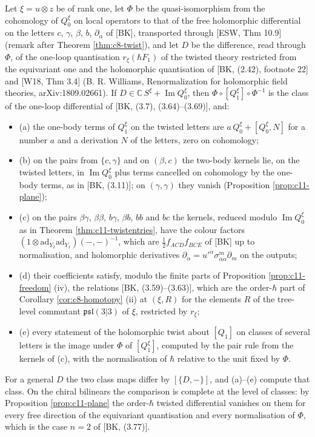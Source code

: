 \begin{theorem}
\label{thm:c11-twistcheck}
Let $\xi=u\otimes z$ be of rank one, let $\Phi$ be the quasi-isomorphism from the cohomology of $Q^\xi_0$ on local operators to that of the free holomorphic differential on the letters $c$, $\gamma$, $\beta$, $b$, $\partial_{\dot\alpha}$ of [BK], transported through [ESW, Thm 10.9] (remark after Theorem \ref{thm:c8-twist}), and let $D$ be the difference, read through $\Phi$, of the one-loop quantisation $r_\xi(\hbar F_1)$ of the twisted theory restricted from the equivariant one and the holomorphic quantisation of [BK, (2.42), footnote 22] and [W18, Thm 3.4] (B. R. Williams, Renormalization for holomorphic field theories, arXiv:1809.02661). If $D\in\mathbb C\,S^\xi+\operatorname{Im}Q^\xi_0$, then $\Phi\circ[Q^\xi_1]\circ\Phi^{-1}$ is the class of the one-loop differential of [BK, (3.7), (3.64)--(3.69)], and:
\begin{itemize}
\item (a) the one-body terms of $Q^\xi_1$ on the twisted letters are $a\,Q^\xi_0+[Q^\xi_0,N]$ for a number $a$ and a derivation $N$ of the letters, zero on cohomology;
\item (b) on the pairs from $\{c,\gamma\}$ and on $(\beta,c)$ the two-body kernels lie, on the twisted letters, in $\operatorname{Im}Q^\xi_0$ plus terms cancelled on cohomology by the one-body terms, as in [BK, (3.11)]; on $(\gamma,\gamma)$ they vanish (Proposition \ref{prop:c11-plane});
\item (c) on the pairs $\beta\gamma$, $\beta\beta$, $b\gamma$, $\beta b$, $bb$ and $bc$ the kernels, reduced modulo $\operatorname{Im}Q^\xi_0$ as in Theorem \ref{thm:c11-twistentries}, have the colour factors $(1\otimes\mathrm{ad}_{Y_2}\mathrm{ad}_{Y_1})(-,-)^{-1}$, which are $\tfrac12f_{ACD}f_{BCE}$ of [BK] up to normalisation, and holomorphic derivatives $\partial_{\dot\alpha}=u'^\alpha\sigma^m_{\alpha\dot\alpha}\partial_m$ on the outputs;
\item (d) their coefficients satisfy, modulo the finite parts of Proposition \ref{prop:c11-freedom} (iv), the relations [BK, (3.59)--(3.63)], which are the order-$\hbar$ part of Corollary \ref{cor:c8-homotopy} (ii) at $(\xi,R)$ for the elements $R$ of the tree-level commutant $\mathfrak{psl}(3|3)$ of $\xi$, restricted by $r_\xi$;
\item (e) every statement of the holomorphic twist about $[Q_1]$ on classes of several letters is the image under $\Phi$ of $[Q^\xi_1]$, computed by the pair rule from the kernels of (c), with the normalisation of $\hbar$ relative to the unit fixed by $\Phi$.
\end{itemize}
For a general $D$ the two class maps differ by $[\{D,-\}]$, and (a)--(e) compute that class. On the chiral bilinears the comparison is complete at the level of classes: by Proposition \ref{prop:c11-plane} the order-$\hbar$ twisted differential vanishes on them for every free direction of the equivariant quantisation and every normalisation of $\Phi$, which is the case $n=2$ of [BK, (3.77)].
\end{theorem}


